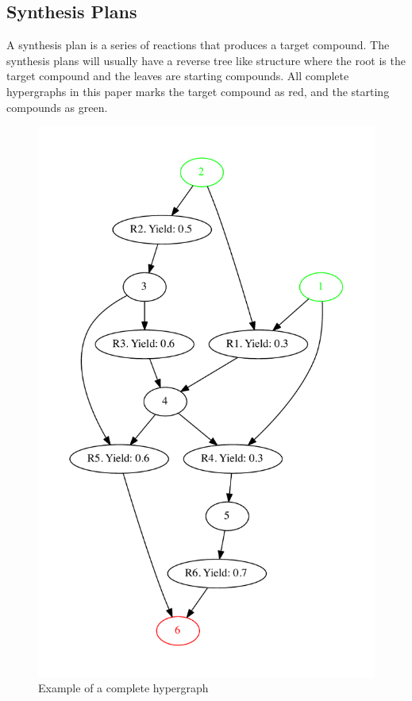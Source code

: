 \documentclass[a4paper,10pt,titlepage]{paper}
\begin{document}
\subsection{Synthesis Plans}
A synthesis plan is a series of reactions that produces a target compound. The synthesis plans will usually have a reverse tree like structure where the root is the target compound and the leaves are starting compounds. All complete hypergraphs in this paper marks the target compound as red, and the starting compounds as green.
\begin{figure}[H]
\centering
\includegraphics[scale=0.5]{TestGrafer/PaperTest.pdf}
\caption{Example of a complete hypergraph}
\label{fig::CompletegraphExample}
\end{figure}
\end{document}
